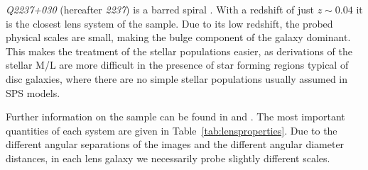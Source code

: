 \documentclass[useAMS,usenatbib]{mn2e}
\begin{document}
\textit{Q2237+030} (hereafter \textit{2237}) is a barred spiral \citep{1988AJ.....95.1331Y}. With a redshift of just $z\sim0.04$ it is the closest lens system of the sample. Due to its low redshift, the probed physical scales are small, making the bulge component of the galaxy dominant. This makes the treatment of the stellar populations easier, as derivations of the stellar M/L are more difficult in the presence of star forming regions typical of disc galaxies, where there are no simple stellar populations usually assumed in SPS models.

Further information on the sample can be found in \citet{2011ApJ...740...97L} and \citet{2012A&A...538A..99S}. The most important quantities of each system are given in Table~\ref{tab:lensproperties}. Due to the different angular separations of the images and the different angular diameter distances, in each lens galaxy we necessarily probe slightly different scales.
\end{document}
